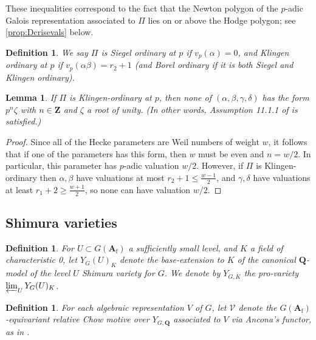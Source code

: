 \documentclass[cjm]{ipart}
\theoremstyle{plain}
\newtheorem{lemma}[theorem]{Lemma}
\newtheorem{definition}[theorem]{Definition}
\theoremstyle{remark}
\newcommand{\Af}{\AA_{\mathrm{f}}}
\newcommand{\QQ}{\mathbf{Q}}
\newcommand{\ZZ}{\mathbf{Z}}
\newcommand{\cV}{\mathcal{V}}
\renewcommand{\AA}{\mathbf{A}}
\numberwithin{equation}{subsection}
\renewcommand{\le}{\leqslant}
\renewcommand{\ge}{\geqslant}
\begin{document}
  \begin{remark}\label{rem:Dcrisevals}
   These inequalities correspond to the fact that the Newton polygon of the $p$-adic Galois representation associated to $\Pi$ lies on or above the Hodge polygon; see \cref{prop:Dcrisevals} below.
  \end{remark}

  \begin{definition}
   We say $\Pi$ is \emph{Siegel ordinary} at $p$ if $v_p(\alpha) = 0$, and \emph{Klingen ordinary} at $p$ if $v_p(\alpha\beta) = r_2 + 1$ (and \emph{Borel ordinary} if it is both Siegel and Klingen ordinary).
  \end{definition}

  \begin{lemma}
   \label{lem:trivzero}
   If $\Pi$ is Klingen-ordinary at $p$, then none of $(\alpha, \beta, \gamma, \delta)$ has the form $p^n \zeta$ with $n \in \ZZ$ and $\zeta$ a root of unity. (In other words, Assumption 11.1.1 of \cite{LSZ17} is satisfied.)
  \end{lemma}

  \begin{proof}
   Since all of the Hecke parameters are Weil numbers of weight $w$, it follows that if one of the parameters has this form, then $w$ must be even and $n = w/2$. In particular, this parameter has $p$-adic valuation $w/2$. However, if $\Pi$ is Klingen-ordinary then $\alpha, \beta$ have valuations at most  $r_2 + 1 \le \tfrac{w-1}{2}$, and $\gamma, \delta$ have valuations at least $r_1 + 2 \ge \tfrac{w+1}{2}$, so none can have valuation $w/2$.
  \end{proof}

 \subsection{Shimura varieties}\label{ss:Shimvarandcoeff}

  \begin{definition}
   For $U \subset G(\Af)$ a sufficiently small level, and $K$ a field of characteristic 0, let $Y_{G}(U)_{K}$ denote the base-extension to $K$ of the canonical $\QQ$-model of the level $U$ Shimura variety for $G$. We denote by $Y_{G, K}$ the pro-variety $\varprojlim_U Y_G(U)_{K}$.
  \end{definition}

  \begin{definition}
   For each algebraic representation $V$ of $G$, let $\cV$ denote the
   $G(\Af)$-equivariant relative Chow motive over $Y_{G, \QQ}$ associated to $V$ via Ancona's functor, as in \cite[\S 6.2]{LSZ17}.
  \end{definition}
\end{document}
